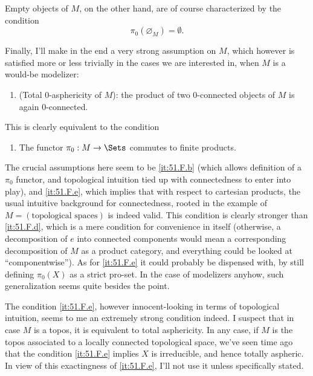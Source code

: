 Empty objects of $M$, on the other hand, are of course characterized
by the condition
\[\pi_0(\varnothing_M)=\emptyset.\]

Finally, I'll make in the end a very strong assumption on $M$, which
however is satisfied more or less trivially in the cases we are
interested in, when $M$ is a would-be modelizer:
\begin{enumerate}[label=\alph*),resume]
\item\label{it:51.F.e}
  (Total $0$-asphericity of $M$): the product of two $0$-connected
  objects of $M$ is again $0$-connected.
\end{enumerate}

This is clearly equivalent to the condition
\begin{enumerate}[label=\alph*'),start=5]
\item\label{it:51.F.eprime}
  The functor $\pi_0:M\to\Sets$ commutes to finite products.
\end{enumerate}
\begin{remarks}
  The crucial assumptions here seem to be \ref{it:51.F.b}
  (which allows definition of a $\pi_0$ functor, and topological
  intuition tied up with connectedness to enter into play), and
  \ref{it:51.F.e}, which implies that with respect to cartesian
  products, the usual intuitive background for connectedness, rooted
  in the example of $M = (\text{topological spaces})$ is indeed
  valid. This condition is clearly stronger than \ref{it:51.F.d},
  which is a mere condition for convenience in itself (otherwise, a
  decomposition of $e$ into connected components would mean a
  corresponding decomposition of $M$ as a product category, and
  everything could be looked at ``componentwise''). As for
  \ref{it:51.F.e} it could probably be dispensed with, by still
  defining $\pi_0(X)$ as a strict pro-set. In the case of modelizers
  anyhow, such generalization seems quite besides the point.

  The condition \ref{it:51.F.e}, however innocent-looking in terms of
  topological intuition, seems to me an extremely strong condition
  indeed. I suspect that in case $M$ is a topos, it is equivalent to
  total asphericity. In any case, if $M$ is the topos associated to a
  locally connected topological space, we've seen time ago that the
  condition \ref{it:51.F.e} implies $X$ is irreducible, and hence
  totally aspheric. In view of this exactingness of \ref{it:51.F.e},
  I'll not use it unless specifically stated.
\end{remarks}

